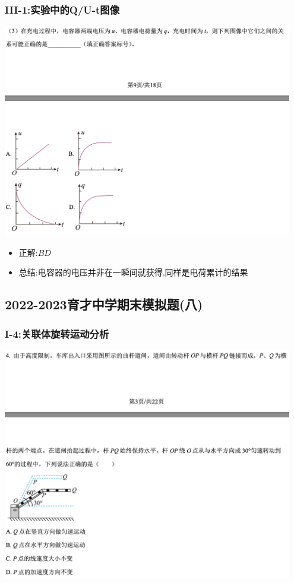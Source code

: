 \documentclass{article}
\begin{document}
\subsubsection{III-1:实验中的Q/U-t图像}
\includegraphics[width=0.95\textwidth,keepaspectratio]{./pictures/1.1-4.png}

\begin{itemize}
    \item 正解:\quad $BD$
    \item 总结:\quad 电容器的电压并非在一瞬间就获得,同样是电荷累计的结果
\end{itemize}

\vspace{2em}

\subsection{2022-2023育才中学期末模拟题(八)}

\subsubsection{I-4:关联体旋转运动分析}
\includegraphics[width=0.95\textwidth,keepaspectratio]{./pictures/1.2-1.png}
\end{document}
